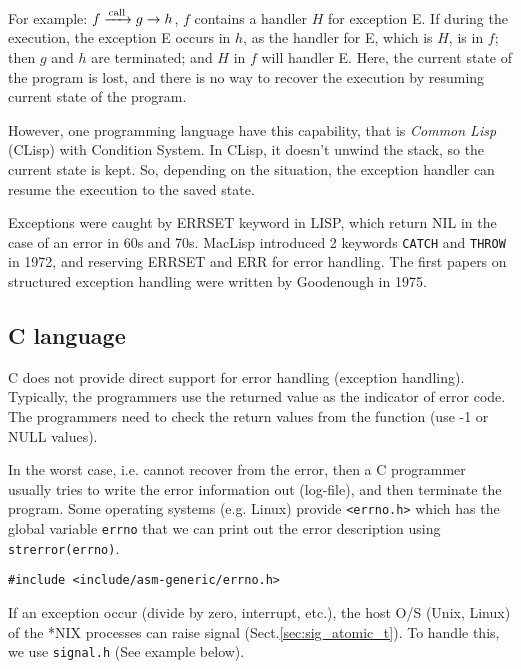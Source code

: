   For example:
  $f\cee{->[\text{call}]} g \rightarrow h$, $f$ contains a handler $H$ for
  exception E. If during the execution, the exception E occurs in $h$, as the
  handler for E, which is $H$, is in  $f$; then $g$ and $h$ are terminated; and
  $H$ in $f$ will handler  E. Here, the current state of the program is lost,
  and there is no  way to recover the execution by resuming current state of the
   program. 
   
 However, one programming language have this capability,  that is
 {\it Common Lisp} (CLisp) with Condition System. In CLisp,  it doesn't unwind
  the stack, so the current state is kept. So,  depending on the situation, the
  exception handler can resume the execution to the saved state.

Exceptions were caught by ERRSET keyword in LISP, which return NIL in the case
of an error in 60s and 70s.
MacLisp introduced 2 keywords \verb!CATCH! and \verb!THROW! in 1972, and
reserving ERRSET and ERR for error handling. The first papers on structured
exception handling were written by Goodenough in 1975.


\subsection{C language}

C does not provide direct support for error handling (exception handling).
Typically, the programmers use the returned value as the indicator of error
code. The programmers need to check the return values from the function (use -1
or NULL values).

In the worst case, i.e. cannot recover from the error, then a C programmer
usually tries to write the error information out (log-file), and then terminate
the program. Some operating systems (e.g. Linux) provide \verb!<errno.h>! which
has the global variable \verb!errno! that we can print out the error description
using \verb!strerror(errno)!.

\begin{verbatim}
#include <include/asm-generic/errno.h>
\end{verbatim}

If an exception occur (divide by zero, interrupt, etc.), the host O/S (Unix,
Linux) of the *NIX processes can raise signal (Sect.\ref{sec:sig_atomic_t}). To
handle this, we use \verb!signal.h! (See example below).

